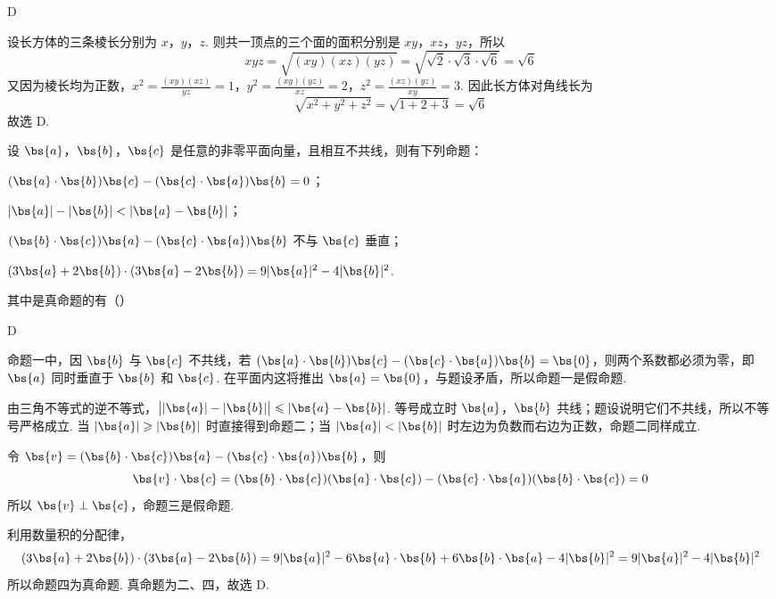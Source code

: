 \begin{answer}
D
\end{answer}

\begin{solution}
设长方体的三条棱长分别为 \(x\)，\(y\)，\(z\). 则共一顶点的三个面的面积分别是 \(xy\)，\(xz\)，\(yz\)，所以
\[
xyz=\sqrt{(xy)(xz)(yz)}=\sqrt{\sqrt{2}\cdot\sqrt{3}\cdot\sqrt{6}}=\sqrt{6}
\]
又因为棱长均为正数，\(x^{2}=\frac{(xy)(xz)}{yz}=1\)，\(y^{2}=\frac{(xy)(yz)}{xz}=2\)，\(z^{2}=\frac{(xz)(yz)}{xy}=3\).
因此长方体对角线长为
\[
\sqrt{x^{2}+y^{2}+z^{2}}=\sqrt{1+2+3}=\sqrt{6}
\]
故选 D.
\end{solution}

\begin{problem}
设 \(\bs{a}\)，\(\bs{b}\)，\(\bs{c}\) 是任意的非零平面向量，且相互不共线，则有下列命题：

\begin{circlelist}
\item \((\bs{a} \cdot \bs{b})\bs{c} - (\bs{c} \cdot \bs{a})\bs{b} = 0\)；
\item \(|\bs{a}| - |\bs{b}| < |\bs{a} - \bs{b}|\)；
\item \((\bs{b} \cdot \bs{c})\bs{a} - (\bs{c} \cdot \bs{a})\bs{b}\) 不与 \(\bs{c}\) 垂直；
\item \((3\bs{a} + 2\bs{b}) \cdot (3\bs{a} - 2\bs{b}) = 9|\bs{a}|^{2} - 4|\bs{b}|^{2}\).
\end{circlelist}

其中是真命题的有（\quad）

\choices
    {}
    {}
    {}
    {}
\end{problem}

\begin{answer}
D
\end{answer}

\begin{solution}
命题一中，因 \(\bs{b}\) 与 \(\bs{c}\) 不共线，若
\((\bs{a}\cdot\bs{b})\bs{c}-(\bs{c}\cdot\bs{a})\bs{b}=\bs{0}\)，则两个系数都必须为零，即 \(\bs{a}\) 同时垂直于 \(\bs{b}\) 和 \(\bs{c}\). 在平面内这将推出 \(\bs{a}=\bs{0}\)，与题设矛盾，所以命题一是假命题.

由三角不等式的逆不等式，\(\bigl||\bs{a}|-|\bs{b}|\bigr|\leqslant|\bs{a}-\bs{b}|\). 等号成立时 \(\bs{a}\)，\(\bs{b}\) 共线；题设说明它们不共线，所以不等号严格成立. 当 \(|\bs{a}|\geqslant|\bs{b}|\) 时直接得到命题二；当 \(|\bs{a}|<|\bs{b}|\) 时左边为负数而右边为正数，命题二同样成立.

令 \(\bs{v}=(\bs{b}\cdot\bs{c})\bs{a}-(\bs{c}\cdot\bs{a})\bs{b}\)，则
\[
\bs{v}\cdot\bs{c}=(\bs{b}\cdot\bs{c})(\bs{a}\cdot\bs{c})-(\bs{c}\cdot\bs{a})(\bs{b}\cdot\bs{c})=0
\]
所以 \(\bs{v}\perp\bs{c}\)，命题三是假命题.

利用数量积的分配律，
\[
(3\bs{a}+2\bs{b})\cdot(3\bs{a}-2\bs{b})
=9|\bs{a}|^{2}-6\bs{a}\cdot\bs{b}+6\bs{b}\cdot\bs{a}-4|\bs{b}|^{2}
=9|\bs{a}|^{2}-4|\bs{b}|^{2}
\]
所以命题四为真命题. 真命题为二、四，故选 D.
\end{solution}

